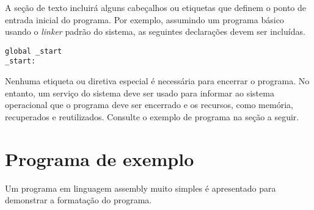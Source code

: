 A seção de texto incluirá alguns cabeçalhos ou etiquetas que definem o ponto de entrada inicial do programa. Por exemplo, assumindo um programa básico usando o \textit{linker} padrão do sistema, as seguintes declarações devem ser incluídas.
\begin{verbatim}
global _start
_start:
\end{verbatim}

Nenhuma etiqueta ou diretiva especial é necessária para encerrar o programa. No entanto, um serviço do sistema deve ser usado para informar ao sistema operacional que o programa deve ser encerrado e os recursos, como memória, recuperados e reutilizados. Consulte o
exemplo de programa na seção a seguir.

\section{Programa de exemplo}
Um programa em linguagem assembly muito simples é apresentado para demonstrar a formatação do programa.

